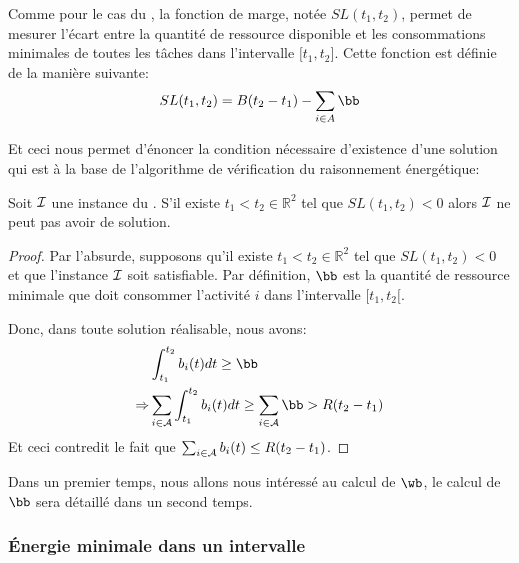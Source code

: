 Comme pour le cas du \CUSP, la fonction de marge, notée $SL(t_1,t_2)$,
permet de mesurer l'écart entre la quantité de ressource disponible et
les consommations minimales de toutes les tâches dans l'intervalle
${[}t_1,t_2{]}$. Cette fonction est définie de la manière suivante:
\[ SL(t_1,t_2)=B(t_2-t_1)-\sum\limits_{i \in A} \bb \]

Et ceci nous permet d'énoncer la condition nécessaire d'existence
d'une solution qui est à la base de l'algorithme de vérification du
raisonnement énergétique:

\begin{theo}
  \label{th:ER_CECSP}
  Soit ${\cal I}$ une instance du \CECSP. S'il existe $t_1 < t_2 \in
  \mathbb{R}^2$ tel que $SL(t_1,t_2) <0$ alors ${\cal I}$ ne peut pas avoir
  de solution.
\end{theo}

\begin{proof}
  Par l'absurde, supposons qu'il existe $t_1 < t_2 \in \mathbb{R}^2$ tel
  que $SL(t_1,t_2) <0$ et que l'instance ${\cal I}$ soit satisfiable. Par
  définition, $\bb$ est la quantité de ressource minimale que doit
  consommer l'activité $i$ dans l'intervalle $[t_1,t_2{[}$. 

  Donc, dans toute solution réalisable, nous avons: 
  \begin{align*}
    & \int_{t_1}^{t_2} b_i(t)dt \ge \bb\\
    \Rightarrow  & \sum_{i \in \A} \int_{t_1}^{t_2} b_i(t)dt \ge \sum_{i
                   \in \A}  \bb > R(t_2-t_1)
  \end{align*}
  Et ceci contredit le fait que $\sum_{i \in {\cal A}} b_i(t) \le
  R(t_2-t_1)$. 
\end{proof}

Dans un premier temps, nous allons nous intéressé au calcul de $\wb$,
le calcul de $\bb$ sera détaillé dans un second temps. 


\subsubsection{{\'E}nergie minimale dans un intervalle}

